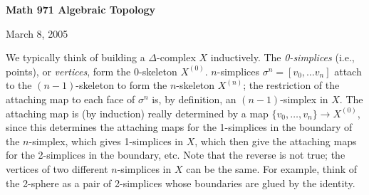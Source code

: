 \def\ccy{\Cyan}		  %
\def\cpb{\ProcessBlue}	  %
\def\csb{\SkyBlue}	  %
\def\ctu{\Turquoise}	  %
\def\ctb{\TealBlue}	  %
\def\caq{\Aquamarine}	  %
\def\cbg{\BlueGreen}	  %
\def\cem{\Emerald}	  %
\def\csg{\SeaGreen}	  %
\def\cgg{\Green}	  %
\def\cfg{\ForestGreen}	  %
\def\cpg{\PineGreen}	  %
\def\clg{\LimeGreen}	  %
\def\cyg{\YellowGreen}	  %
\def\cspg{\SpringGreen}	  %
\def\cog{\OliveGreen}	  %
\def\pars{\RawSienna}	  %
\def\cse{\Sepia}		  %
\def\cbr{\Brown}		  %
\def\cta{\Tan}		  %
\def\cgr{\Gray}		  %
\def\cbl{\Black}		  %
\def\cwh{\White}		  %


\loadmsbm



\def\ctln{\centerline}
\def\u{\underbar}
\def\ssk{\smallskip}
\def\msk{\medskip}
\def\bsk{\bigskip}
\def\hsk{\hskip.1in}
\def\hhsk{\hskip.2in}
\def\dsl{\displaystyle}
\def\hskp{\hskip1.5in}

\def\lra{$\Leftrightarrow$ }
\def\ra{\rightarrow}
\def\mpto{\logmapsto}
\def\pu{\pi_1}
\def\mpu{$\pi_1$}
\def\sig{\Sigma}
\def\msig{$\Sigma$}
\def\ep{\epsilon}
\def\sset{\subseteq}
\def\del{\partial}
\def\inv{^{-1}}
\def\wtl{\widetilde}
\def\lra{\Leftrightarrow}



\ctln{\bf Math 971 Algebraic Topology}

\ssk

\ctln{March 8, 2005}

\msk

We typically think of building a $\Delta$-complex $X$ inductively. 
The {\it 0-simplices}
(i.e., points), or {\it vertices}, form the 0-skeleton 
$X^{(0)}$. $n$-simplices $\sigma^n = [v_0,\ldots v_n]$ attach 
to the $(n-1)$-skeleton
to form the $n$-skeleton $X^{(n)}$; the restriction
of the attaching map to each face of $\sigma^n$ is, by definition,
an $(n-1)$-simplex in $X$. The attaching map is (by induction)
really determined by a map $\{v_0,\ldots ,v_n\}\ra X^{(0)}$, since this 
determines the attaching maps for the 1-simplices in the boundary of the
$n$-simplex, which 
gives 1-simplices in $X$, which then give the attaching maps for
the 2-simplices in the boundary, etc. Note that the reverse is not true;
the vertices of two different $n$-simplices in $X$ can be the same.
For example, think of the 2-sphere as a pair of 2-simplices whose 
boundaries are glued by the identity. 

